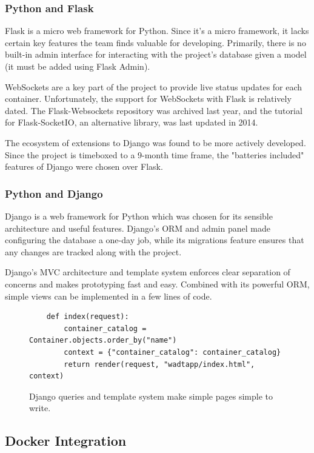 \documentclass[12pt]{article}
\begin{document}
\subsubsection{Python and Flask}
Flask is a micro web framework for Python. Since it's a micro framework, it lacks certain key features the team finds valuable for developing. Primarily, there is no built-in admin interface for interacting with the project's database given a model (it must be added using Flask Admin).

WebSockets are a key part of the project to provide live status updates for each container. Unfortunately, the support for WebSockets with Flask is relatively dated. The Flask-Websockets repository was archived last year, and the tutorial for Flask-SocketIO, an alternative library, was last updated in 2014.

The ecosystem of extensions to Django was found to be more actively developed. Since the project is timeboxed to a 9-month time frame, the "batteries included" features of Django were chosen over Flask.

\subsubsection{Python and Django}
Django is a web framework for Python which was chosen for its sensible architecture and useful features. Django's ORM and admin panel made configuring the database a one-day job, while its migrations feature ensures that any changes are tracked along with the project.

Django's MVC architecture and template system enforces clear separation of concerns and makes prototyping fast and easy. Combined with its powerful ORM, simple views can be implemented in a few lines of code.
\begin{figure}[H]
	\centering
	\begin{verbatim}
	def index(request):
	    container_catalog = Container.objects.order_by("name")
	    context = {"container_catalog": container_catalog}
	    return render(request, "wadtapp/index.html", context)
	\end{verbatim}
	\caption{Django queries and template system make simple pages simple to write.}
	\label{fig:indexview}
\end{figure}

\subsection{Docker Integration}
\end{document}
